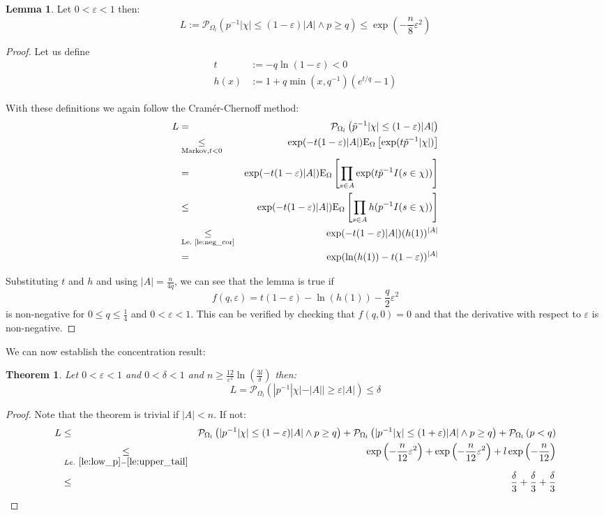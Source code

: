 \documentclass{article}
\newcommand{\prob}{\mathcal P}
\newcommand{\expectation}{\mathrm{E}}
\newcommand{\eps}{\varepsilon}
\newtheorem{theorem}{Theorem}
\theoremstyle{definition}
\newtheorem{lemma}{Lemma}
\begin{document}
\begin{lemma}\label{le:lower_tail}
Let $0 < \eps < 1$ then:
\[
  L := \prob_{\Omega_l} ( p^{-1} |\chi| \leq (1-\eps)|A| \wedge p \geq q) \leq \exp\left(-\frac{n}{8} \eps^2\right)
\]
\end{lemma}
\begin{proof}
Let us define
\begin{align*}
  t & := - q \ln(1-\eps) < 0 \\
  h(x) & := 1+q \min(x,q^{-1}) (e^{t/q}-1)  
\end{align*}

With these definitions we again follow the Cram\'{e}r-Chernoff method:
{\allowdisplaybreaks
\begin{eqnarray*}
  L & = & \prob_{\Omega_l} \left( \tilde{p}^{-1} |\chi| \leq (1-\eps)|A| \right) \\
    & \underset{\textrm{Markov,}t<0}{\leq} & \exp( -t (1-\eps) |A| ) \expectation_\Omega \left[ \exp ( t \tilde{p}^{-1} |\chi| ) \right] \\
    & = & \exp( -t (1-\eps) |A| ) \expectation_\Omega \left[ \prod_{s \in A} \exp ( t \tilde{p}^{-1} I(s \in \chi) ) \right] \\
    & \leq & \exp( -t (1-\eps) |A| ) \expectation_\Omega \left[ \prod_{s \in A} h( p^{-1} I(s \in \chi) ) \right] \\
    & \underset{\textrm{Le.~\ref{le:neg_cor}}}{\leq} & \exp( -t (1-\eps) |A| ) (h(1))^{|A|} \\
    & = & \exp( \ln(h(1)) -t (1-\eps) )^{|A|}
\end{eqnarray*}
}

Substituting $t$ and $h$ and using $|A| = \frac{n}{4q}$, we can see that the lemma is true if
\[
  f(q,\eps) = t (1-\eps) - \ln(h(1)) - \frac{q}{2} \eps^2
\]
is non-negative for $0 \leq q \leq \frac{1}{4}$ and $0 < \eps < 1$.
This can be verified by checking that $f(q,0) = 0$ and that the derivative with respect to $\eps$ is non-negative.
\end{proof}
We can now establish the concentration result:
\begin{theorem}
Let $0 < \eps < 1$ and $0 < \delta < 1$ and $n \geq \frac{12}{\eps^2} \ln\left(\frac{3l}{\delta}\right)$ then:
\[
  L = \prob_{\Omega_l} \left( | p^{-1} |\chi| - |A| | \geq \eps |A| \right) \leq \delta
\]
\end{theorem}
\begin{proof}
Note that the theorem is trivial if $|A| < n$. If not:
\begin{eqnarray*}
  L & \leq & \prob_{\Omega_l} \left( | p^{-1} |\chi| \leq (1-\eps) |A| \wedge p \geq q \right) +
    \prob_{\Omega_l} \left( | p^{-1} |\chi| \leq (1+\eps) |A| \wedge p \geq q \right) +
    \prob_{\Omega_l} \left( p < q \right) \\
    & \underset{Le.~\ref{le:low_p}-\ref{le:upper_tail}}{\leq} &
    \exp\left( - \frac{n}{12} \eps^2 \right)  + \exp\left( - \frac{n}{12} \eps^2 \right) + l \exp\left( - \frac{n}{12} \right) \\
    & \leq & \frac{\delta}{3} + \frac{\delta}{3} + \frac{\delta}{3}
\end{eqnarray*}
\end{proof}
\end{document}
